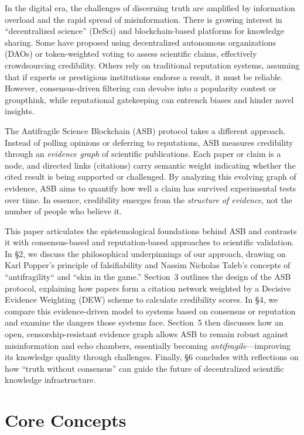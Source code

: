 \documentclass{article}
\begin{document}
In the digital era, the challenges of discerning truth are amplified by information overload and the rapid spread of misinformation. There is growing interest in ``decentralized science'' (DeSci) and blockchain-based platforms for knowledge sharing. Some have proposed using decentralized autonomous organizations (DAOs) or token-weighted voting to assess scientific claims, effectively crowdsourcing credibility. Others rely on traditional reputation systems, assuming that if experts or prestigious institutions endorse a result, it must be reliable. However, consensus-driven filtering can devolve into a popularity contest or groupthink, while reputational gatekeeping can entrench biases and hinder novel insights.

The Antifragile Science Blockchain (ASB) protocol takes a different approach. Instead of polling opinions or deferring to reputations, ASB measures credibility through an \emph{evidence graph} of scientific publications. Each paper or claim is a node, and directed links (citations) carry semantic weight indicating whether the cited result is being supported or challenged. By analyzing this evolving graph of evidence, ASB aims to quantify how well a claim has survived experimental tests over time. In essence, credibility emerges from the \emph{structure of evidence}, not the number of people who believe it.

This paper articulates the epistemological foundations behind ASB and contrasts it with consensus-based and reputation-based approaches to scientific validation. In \S2, we discuss the philosophical underpinnings of our approach, drawing on Karl Popper's principle of falsifiability and Nassim Nicholas Taleb's concepts of ``antifragility`` and ``skin in the game.'' Section~3 outlines the design of the ASB protocol, explaining how papers form a citation network weighted by a Decisive Evidence Weighting (DEW) scheme to calculate credibility scores. In \S4, we compare this evidence-driven model to systems based on consensus or reputation and examine the dangers those systems face. Section~5 then discusses how an open, censorship-resistant evidence graph allows ASB to remain robust against misinformation and echo chambers, essentially becoming \emph{antifragile}---improving its knowledge quality through challenges. Finally, \S6 concludes with reflections on how ``truth without consensus'' can guide the future of decentralized scientific knowledge infrastructure.

\section{Core Concepts}
\end{document}
